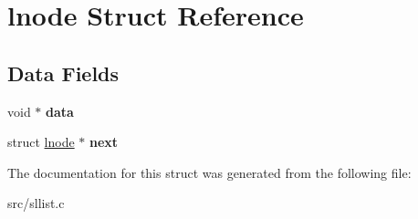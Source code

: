\hypertarget{structlnode}{\section{lnode Struct Reference}
\label{structlnode}
}
\subsection*{Data Fields}
\begin{DoxyCompactItemize}
\item 
\hypertarget{structlnode_a8da25fe4bd1be77379aa9638e6a2e3e8}{void $\ast$ {\bfseries data}}\label{structlnode_a8da25fe4bd1be77379aa9638e6a2e3e8}

\item 
\hypertarget{structlnode_a6901eb65ef0bcde7bf8ea1e5a0b21780}{struct \hyperlink{structlnode}{lnode} $\ast$ {\bfseries next}}\label{structlnode_a6901eb65ef0bcde7bf8ea1e5a0b21780}

\end{DoxyCompactItemize}


The documentation for this struct was generated from the following file\-:\begin{DoxyCompactItemize}
\item 
src/sllist.\-c\end{DoxyCompactItemize}
